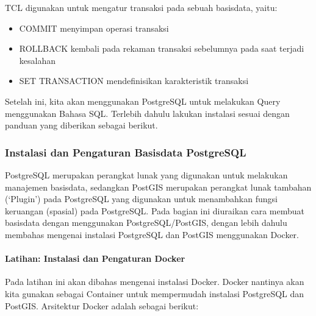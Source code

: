 \documentclass[letterpaper,10pt,english]{sphinxmanual}
\begin{document}
\begin{itemize}
TCL digunakan untuk mengatur transaksi pada sebuah basisdata, yaitu:
\begin{itemize}
\item {} 
COMMIT \sphinxhyphen{} menyimpan operasi transaksi

\item {} 
ROLLBACK \sphinxhyphen{} kembali pada rekaman transaksi sebelumnya pada saat terjadi kesalahan

\item {} 
SET TRANSACTION \sphinxhyphen{} mendefinisikan karakteristik transaksi

\end{itemize}

\end{itemize}

Setelah ini, kita akan menggunakan PostgreSQL untuk melakukan Query menggunakan Bahasa SQL. Terlebih dahulu lakukan instalasi sesuai dengan panduan yang diberikan sebagai berikut.


\subsubsection{Instalasi dan Pengaturan Basisdata PostgreSQL}
\label{\detokenize{sesi2/relationaldb:instalasi-dan-pengaturan-basisdata-postgresql}}
PostgreSQL merupakan perangkat lunak yang digunakan untuk melakukan manajemen basisdata, sedangkan PostGIS merupakan perangkat lunak tambahan (‘Plugin’) pada PostgreSQL yang digunakan untuk menambahkan fungsi keruangan (spasial) pada PostgreSQL. Pada bagian ini diuraikan cara membuat basisdata dengan menggunakan PostgreSQL/PostGIS, dengan lebih dahulu membahas mengenai instalasi PostgreSQL dan PostGIS menggunakan Docker.


\paragraph{Latihan: Instalasi dan Pengaturan Docker}
\label{\detokenize{sesi2/relationaldb:latihan-instalasi-dan-pengaturan-docker}}
Pada latihan ini akan dibahas mengenai instalasi Docker. Docker nantinya akan kita gunakan sebagai Container untuk mempermudah instalasi PostgreSQL dan PostGIS. Arsitektur Docker adalah sebagai berikut:

\end{document}
